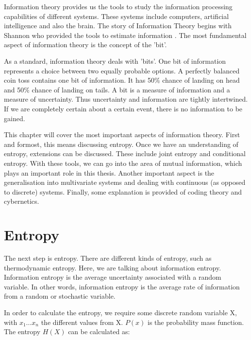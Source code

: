 Information theory provides us the tools to study the information processing capabilities of different systems. These systems include computers, artificial intelligence and also the brain. The story of Information Theory begins with Shannon who provided the tools to estimate information \cite{shin1949mathematical}. The most fundamental aspect of information theory is the concept of the 'bit'. 

As a standard, information theory deals with 'bits'. One bit of information represents a choice between two equally probable options. A perfectly balanced coin toss contains one bit of information. It has 50\% chance of landing on head and 50\% chance of landing on tails. A bit is a measure of information and a measure of uncertainty. Thus uncertainty and information are tightly intertwined. If we are completely certain about a certain event, there is no information to be gained. 

This chapter will cover the most important aspects of information theory. First and formost, this means discussing entropy. Once we have an understanding of entropy, extensions can be discussed. These include joint entropy and conditional entropy. With these tools, we can go into the area of mutual information, which plays an important role in this thesis. Another important aspect is the generalisation into multivariate systems and dealing with continuous (as opposed to discrete) systems. Finally, some explanation is provided of coding theory and cybernetics.

\section{Entropy}

The next step is entropy. There are different kinds of entropy, such as thermodynamic entropy. Here, we are talking about information entropy. Information entropy is the average uncertainty associated with a random variable. In other words, information entropy is the average rate of information from a random or stochastic variable. 

In order to calculate the entropy, we require some discrete random variable X, with ${x_1 ... x_n}$ the different values from X. $P(x)$ is the probability mass function. The entropy $H(X)$ can be calculated as:

